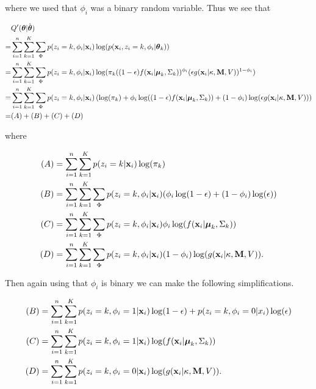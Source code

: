 \documentclass[12pt,english]{article}\usepackage[]{graphicx}\usepackage[]{color}
\begin{document}
where we used that $\phi_i$ was a binary random variable. Thus we see that

\begin{equation}
\begin{split}
&Q'(\boldsymbol{\theta}| \hat{\boldsymbol{\theta}}) \\
 = & \sum_{i=1}^{n} \sum_{k=1}^{K}\sum_{\Phi}p(z_i = k, \phi_i|{\bf x}_i) \log(p({\bf x}_i, z_i = k , \phi_i|\boldsymbol{\theta}_k)) \\
= & \sum_{i=1}^{n} \sum_{k=1}^{K}\sum_{\Phi}p(z_i = k, \phi_i|{\bf x}_i) \log(\pi_k ((1 - \epsilon)f({\bf x}_i|\boldsymbol{\mu}_k, \Sigma_k))^{\phi_i}(\epsilon g({\bf x}_i|\kappa, {\bf M}, V))^{1-\phi_i})  \\
= & \sum_{i=1}^{n} \sum_{k=1}^{K}\sum_{\Phi}p(z_i = k, \phi_i|{\bf x}_i)\left( \log(\pi_k)  + \phi_i\log((1 - \epsilon)f({\bf x}_i|\boldsymbol{\mu}_k, \Sigma_k)) + (1-\phi_i)\log(\epsilon g({\bf x}_i|\kappa, {\bf M}, V))\right)  \\
= & (A) + (B) + (C) + (D)
\end{split}
\end{equation}

where

\begin{equation}
\begin{split}
(A) &= \sum_{i=1}^{n} \sum_{k=1}^{K}p(z_i = k|{\bf x}_i)\log(\pi_k) \\
(B) & = \sum_{i=1}^{n} \sum_{k=1}^{K}\sum_{\Phi}p(z_i = k, \phi_i|{\bf x}_i)(\phi_i\log(1 - \epsilon) + (1-\phi_i)\log(\epsilon))\\
(C) & = \sum_{i=1}^{n} \sum_{k=1}^{K}\sum_{\Phi}p(z_i = k, \phi_i|{\bf x}_i)\phi_i \log (f({\bf x}_i|\boldsymbol{\mu}_k, \Sigma_k))\\
(D)& = \sum_{i=1}^{n} \sum_{k=1}^{K}\sum_{\Phi}p(z_i = k, \phi_i|{\bf x}_i)(1-\phi_i)\log( g({\bf x}_i|\kappa, {\bf M}, V)).\\
\end{split}
\end{equation}

Then again using that $\phi_i$ is binary we can make the following
simplifications.

\begin{equation}\label{equation::q}
\begin{split}
(B) & = \sum_{i=1}^{n} \sum_{k=1}^{K}p(z_i = k, \phi_i = 1|{\bf x}_i)\log(1 - \epsilon) + p(z_i = k, \phi_i = 0|x_i)\log(\epsilon)\\
(C) & = \sum_{i=1}^{n} \sum_{k=1}^{K}p(z_i = k, \phi_i = 1|{\bf x}_i)\log (f({\bf x}_i|\boldsymbol{\mu}_k, \Sigma_k))\\
(D)& = \sum_{i=1}^{n} \sum_{k=1}^{K}p(z_i = k, \phi_i = 0 |{\bf x}_i)\log( g({\bf x}_i|\kappa, {\bf M}, V)).\\
\end{split}
\end{equation}
\end{document}
